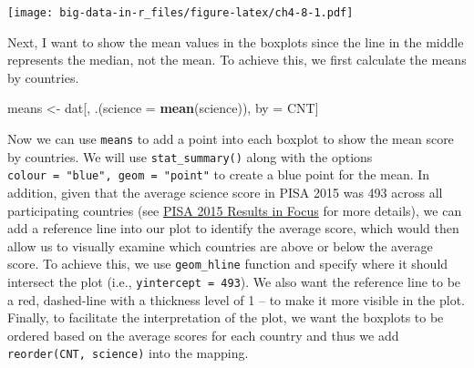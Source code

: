 \documentclass[]{book}
\newenvironment{Shaded}{\begin{snugshade}}{\end{snugshade}}
\newcommand{\DataTypeTok}[1]{\textcolor[rgb]{0.13,0.29,0.53}{#1}}
\newcommand{\KeywordTok}[1]{\textcolor[rgb]{0.13,0.29,0.53}{\textbf{#1}}}
\newcommand{\NormalTok}[1]{#1}
\newcommand{\StringTok}[1]{\textcolor[rgb]{0.31,0.60,0.02}{#1}}
\begin{document}
\texttt{[image: big-data-in-r\_files/figure-latex/ch4-8-1.pdf]}

Next, I want to show the mean values in the boxplots since the line in the middle represents the median, not the mean. To achieve this, we first calculate the means by countries.

\begin{Shaded}
\begin{Highlighting}[]
\NormalTok{means <-}\StringTok{ }\NormalTok{dat[,}
\NormalTok{             .(}\DataTypeTok{science =} \KeywordTok{mean}\NormalTok{(science)),}
\NormalTok{             by =}\StringTok{ }\NormalTok{CNT]}
\end{Highlighting}
\end{Shaded}

Now we can use \texttt{means} to add a point into each boxplot to show the mean score by countries. We will use \texttt{stat\_summary()} along with the options \texttt{colour\ =\ "blue",\ geom\ =\ "point"} to create a blue point for the mean. In addition, given that the average science score in PISA 2015 was 493 across all participating countries (see \href{https://www.oecd.org/pisa/pisa-2015-results-in-focus.pdf}{PISA 2015 Results in Focus} for more details), we can add a reference line into our plot to identify the average score, which would then allow us to visually examine which countries are above or below the average score. To achieve this, we use \texttt{geom\_hline} function and specify where it should intersect the plot (i.e., \texttt{yintercept\ =\ 493}). We also want the reference line to be a red, dashed-line with a thickness level of 1 -- to make it more visible in the plot. Finally, to facilitate the interpretation of the plot, we want the boxplots to be ordered based on the average scores for each country and thus we add \texttt{reorder(CNT,\ science)} into the mapping.
\end{document}
